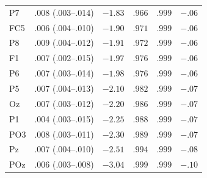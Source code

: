 {\begin{longtable}{llrrrr}
P7 & .008 (.003--.014) & $-1.83$ & $.966$ & $.999$ & $-.06$ \\
FC5 & .006 (.004--.010) & $-1.90$ & $.971$ & $.999$ & $-.06$ \\
P8 & .009 (.004--.012) & $-1.91$ & $.972$ & $.999$ & $-.06$ \\
F1 & .007 (.002--.015) & $-1.97$ & $.976$ & $.999$ & $-.06$ \\
P6 & .007 (.003--.014) & $-1.98$ & $.976$ & $.999$ & $-.06$ \\
P5 & .007 (.004--.013) & $-2.10$ & $.982$ & $.999$ & $-.07$ \\
Oz & .007 (.003--.012) & $-2.20$ & $.986$ & $.999$ & $-.07$ \\
P1 & .004 (.003--.015) & $-2.25$ & $.988$ & $.999$ & $-.07$ \\
PO3 & .008 (.003--.011) & $-2.30$ & $.989$ & $.999$ & $-.07$ \\
Pz & .007 (.004--.010) & $-2.51$ & $.994$ & $.999$ & $-.08$ \\
POz & .006 (.003--.008) & $-3.04$ & $.999$ & $.999$ & $-.10$ \\
\end{longtable}
}
